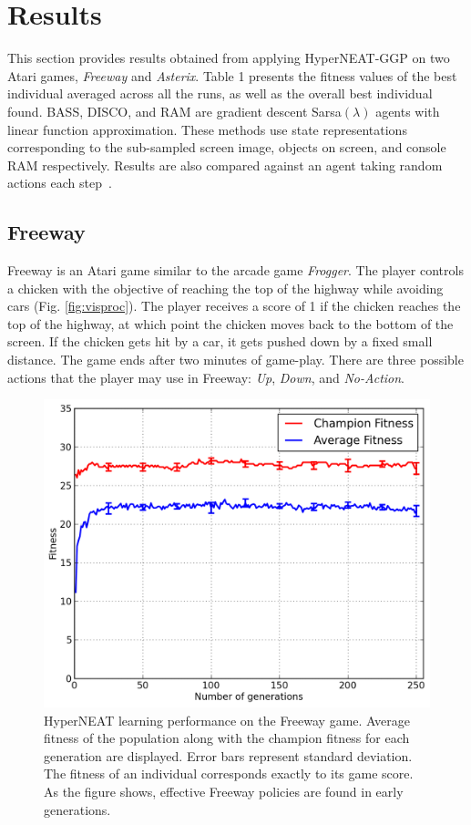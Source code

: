 \documentclass{acm_proc_article-sp}
\begin{document}
\section{Results}
\label{sec:results}
This section provides results obtained from applying HyperNEAT-GGP on two Atari games, \textit{Freeway} and \textit{Asterix}. Table 1 presents the fitness values of the best individual averaged across all the runs, as well as the overall best individual found. BASS, DISCO, and RAM are gradient descent Sarsa$(\lambda)$ agents with linear function approximation. These methods use state representations corresponding to the sub-sampled screen image, objects on screen, and console RAM respectively. Results are also compared against an agent taking random actions each step~\cite{naddaf10}. 

\subsection {Freeway}

Freeway is an Atari game similar to the arcade game \textit{Frogger}. The player controls a chicken with the objective of reaching the top of the highway while avoiding cars (Fig. \ref{fig:visproc}). The player receives a score of 1 if the chicken reaches the top of the highway, at which point the chicken moves back to the bottom of the screen. If the chicken gets hit by a car, it gets pushed down by a fixed small distance. The game ends after two minutes of game-play. There are three possible actions that the player may use in Freeway: \textit{Up}, \textit{Down}, and \textit{No-Action}.

\begin{figure}[ht]
\begin{center}
\includegraphics[width=\columnwidth]{figures/freeway-results.png}
\end{center}
\caption{HyperNEAT learning performance on the Freeway game. Average fitness of the population along with the champion fitness for each generation are displayed. Error bars represent standard deviation. The fitness of an individual corresponds exactly to its game score. As the figure shows, effective Freeway policies are found in early generations.}
\label{fig:freeway-curve}
\end{figure}
\end{document}
